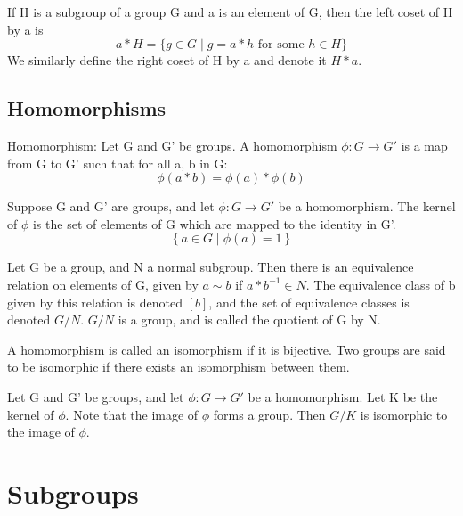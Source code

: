 \documentclass[runningheads,a4paper]{llncs}
\renewcommand{\-}{\setminus}
\begin{document}
\begin{definition}
If H is a subgroup of a group G and a is an element of G, then the left coset of H by a is 
\[
a * H = \{ g \in G \mid g = a * h \text{ for some } h \in H \}
\]
We similarly define the right coset of H by a and denote it $H * a$.
\end{definition}

\subsection{Homomorphisms}

\begin{definition}[Homomorphism]
Homomorphism: Let G and G' be groups. A homomorphism $\phi : G \to G'$ is a map from G to G' such that for all a, b in G:
\[
\phi (a * b) = \phi(a) * \phi(b)
\]
\end{definition}

\begin{definition}[Kernel]
Suppose G and G' are groups, and let $\phi : G \to G'$ be a homomorphism. The kernel of $\phi$ is the set of elements of G which are mapped to the identity in G'.
\[
\left\{ a \in G \mid \phi(a) = 1 \right\}
\]
\end{definition}

\begin{definition}
Let G be a group, and N a normal subgroup. Then there is an equivalence relation on elements of G, given by $a \sim b$ if $a * b^{-1} \in N$. The equivalence class of b given by this relation is denoted $[b]$, and the set of equivalence classes is denoted $G/N$. $G/N$ is a group, and is called the quotient of G by N.
\end{definition}

\begin{definition}[Isomorphism]
A homomorphism is called an isomorphism if it is bijective. Two groups are said to be isomorphic if there exists an isomorphism between them.
\end{definition}

\begin{theorem}
Let G and G' be groups, and let $\phi : G \to G'$ be a homomorphism. Let K be the kernel of $\phi$. Note that the image of $\phi$ forms a group. Then $G/K$ is isomorphic to the image of $\phi$.
\end{theorem}

\section{Subgroups}
\end{document}
